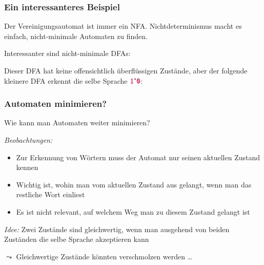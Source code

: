 \documentclass[aspectratio=1610,onlymath]{beamer}
\begin{document}
\begin{frame}\frametitle{Ein interessanteres Beispiel}

Der Vereinigungsautomat ist immer ein NFA. Nichtdeterminismus macht es einfach, nicht-minimale Automaten zu finden.
\medskip

Interessanter sind nicht-minimale DFAs:\medskip

\pause

Dieser DFA hat keine offensichtlich überflüssigen Zustände, aber der folgende kleinere DFA erkennt die selbe Sprache $\mathtt{\textcolor{purple}{1}}^*\mathtt{\textcolor{purple}{0}}$:\medskip


\end{frame}

\begin{frame}\frametitle{Automaten minimieren?}

\alert{Wie kann man Automaten weiter minimieren?}
\bigskip

\emph{Beobachtungen:}
\begin{itemize}
\item Zur Erkennung von Wörtern muss der Automat nur seinen aktuellen Zustand kennen
\item Wichtig ist, wohin man vom aktuellen Zustand aus gelangt, wenn man das restliche Wort einliest
\item Es ist nicht relevant, auf welchem Weg man zu diesem Zustand gelangt ist
\end{itemize}\medskip\pause

\emph{Idee:} Zwei Zustände sind gleichwertig, wenn man ausgehend von beiden Zuständen die selbe Sprache akzeptieren kann
\bigskip

$\leadsto$ Gleichwertige Zustände könnten verschmolzen werden \ldots

\end{frame}
\end{document}
